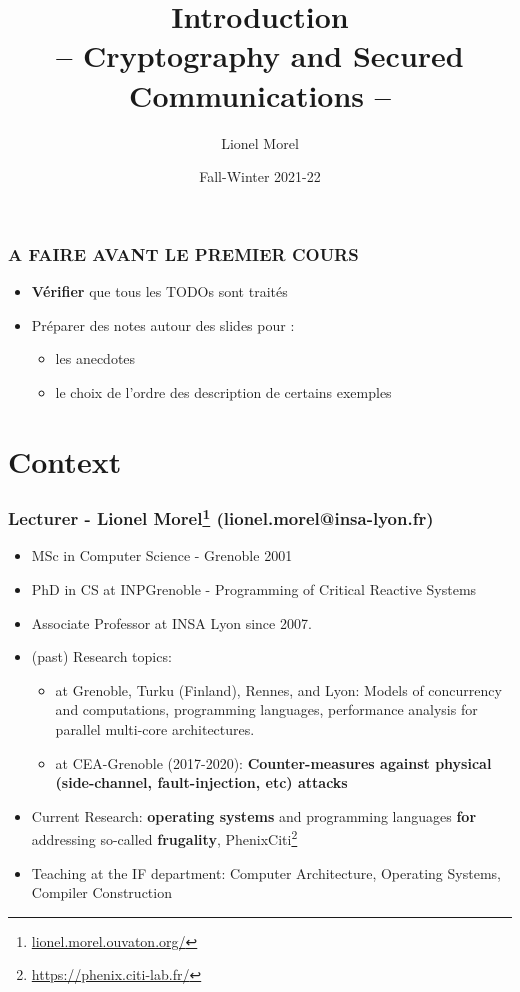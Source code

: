 \documentclass[
hyperref={pdfpagelabels=false}
,xcolor=table
]
{beamer}
\title[CSC - Intro]{Introduction \\ -- Cryptography and Secured Communications --}
\author[]{Lionel Morel}
\institute[]{Telecommunications - INSA Lyon}
\date{Fall-Winter 2021-22}
\begin{document}
\begin{frame}
  \maketitle
\end{frame}


\begin{frame}
  \frametitle{A FAIRE AVANT LE PREMIER COURS}

  \begin{itemize}
  \item \textbf{Vérifier} que tous les TODOs sont traités
  \item Préparer des notes autour des slides pour :
    \begin{itemize}
    \item les anecdotes
    \item le choix de l'ordre des description de certains exemples
    \end{itemize}
  \end{itemize}
\end{frame}

\section{Context}

\begin{frame}
  \frametitle{Lecturer - Lionel Morel\footnote{\url{lionel.morel.ouvaton.org/}} (lionel.morel@insa-lyon.fr)}
  \begin{itemize}
  \item MSc in Computer Science - Grenoble 2001
  \item PhD in CS at INPGrenoble - Programming of Critical Reactive Systems
  \item Associate Professor at INSA Lyon since 2007. 
  \item (past) Research topics:
    \begin{itemize}
    \item at Grenoble, Turku (Finland), Rennes, and Lyon: Models of
      concurrency and computations, programming languages, performance
      analysis for parallel multi-core architectures.
    \item at CEA-Grenoble (2017-2020): \textbf{Counter-measures
        against physical (side-channel, fault-injection, etc) attacks}
    \end{itemize}
  \item Current Research: \textbf{operating systems} and programming
    languages \textbf{for} addressing so-called \textbf{frugality}, Phenix\@ Citi\footnote{\url{https://phenix.citi-lab.fr/}}
  \item Teaching at the IF department: Computer Architecture,
    Operating Systems, Compiler Construction
  \end{itemize}
\end{frame}
\end{document}
